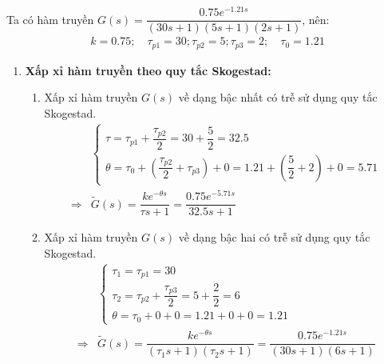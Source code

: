 \begin{solution}
    Ta có hàm truyền $G(s) = \dfrac{0.75e^{-1.21s}}{(30s + 1)(5s + 1)(2s+1)}$, nên:
        \begin{align*}
            k = 0.75; \quad \tau_{p1} = 30; \tau_{p2} = 5; \tau_{p3} = 2; \quad \tau_{0} = 1.21
        \end{align*}
    \begin{enumerate}
        \item \textbf{Xấp xỉ hàm truyền theo quy tắc Skogestad:}
            \begin{enumerate}
                \item Xấp xỉ hàm truyền $G(s)$ về dạng bậc nhất có trễ sử dụng quy tắc Skogestad.
                    \begin{align*}
                        & \left\{\begin{array}{l}
                            \tau = \tau_{p1} + \dfrac{\tau_{p2}}{2} = 30 + \dfrac{5}{2} = 32.5 \\
                            \theta = \tau_0 + \left({\dfrac{\tau_{p2}}{2} + \tau_{p3}}\right) + 0= 1.21 + \left({\dfrac{5}{2} + 2}\right) + 0 = 5.71
                        \end{array}\right. \\
                        \Longrightarrow &
                        \tilde{G}(s) = \dfrac{k e^{-\theta s}}{\tau s + 1} = \dfrac{0.75e^{-5.71s}}{32.5s + 1}
                    \end{align*}
                \item Xấp xỉ hàm truyền $G(s)$ về dạng bậc hai có trễ sử dụng quy tắc Skogestad.
                    \begin{align*}
                        & \left\{\begin{array}{l}
                            \tau_1 = \tau_{p1} = 30\\
                            \tau_2 = \tau_{p2} + \dfrac{\tau_{p3}}{2} = 5 + \dfrac{2}{2} = 6 \\
                            \theta = \tau_0 + 0 + 0 = 1.21 + 0 + 0 = 1.21
                        \end{array}\right. \\
                        \Longrightarrow &
                        \tilde{G}(s) = \dfrac{k e^{-\theta s}}{\left({\tau_1 s + 1}\right) \left({\tau_2 s + 1}\right)} = \dfrac{0.75 e^{-1.21s}}{\left({30s + 1}\right) \left({6s + 1}\right)}
                    \end{align*}
            \end{enumerate}


\end{enumerate}
\end{solution}
